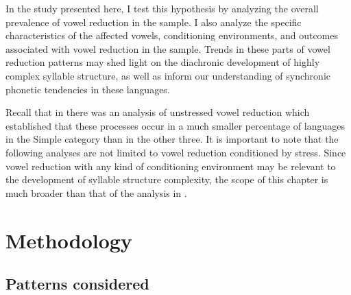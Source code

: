   In the study presented here, I test this hypothesis by analyzing the overall prevalence of vowel reduction in the sample. I also analyze the specific characteristics of the affected vowels, conditioning environments, and outcomes associated with vowel reduction in the sample. Trends in these parts of vowel reduction patterns may shed light on the diachronic development of highly complex syllable structure, as well as inform our understanding of synchronic phonetic tendencies in these languages.

  Recall that in  there was an analysis of unstressed vowel reduction which established that these processes occur in a much smaller percentage of languages in the Simple category than in the other three. It is important to note that the following analyses are not limited to vowel reduction conditioned by stress. Since vowel reduction with any kind of conditioning environment may be relevant to the development of syllable structure complexity, the scope of this chapter is much broader than that of the analysis in .

\section{ Methodology}\label{sec:6.2}
\subsection{ Patterns considered}\label{sec:6.2.1}

